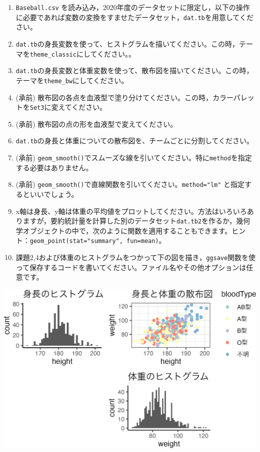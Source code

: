 \documentclass[
  a4paper,
]{ltjsbook}
\providecommand{\tightlist}{%
  \setlength{\itemsep}{0pt}\setlength{\parskip}{0pt}}\usepackage{longtable,booktabs,array}
\begin{document}
\begin{enumerate}
\def\labelenumi{\arabic{enumi}.}
\tightlist
\item
  \texttt{Baseball.csv}
  を読み込み，2020年度のデータセットに限定し，以下の操作に必要であれば変数の変換をすませたデータセット，\texttt{dat.tb}を用意してください。
\item
  \texttt{dat.tb}の身長変数を使って、ヒストグラムを描いてください。この時，テーマを\texttt{theme\_classic}にしてください。。
\item
  \texttt{dat.tb}の身長変数と体重変数を使って、散布図を描いてください。この時，テーマを\texttt{theme\_bw}にしてください。
\item
  (承前)
  散布図の各点を血液型で塗り分けてください。この時，カラーパレットを\texttt{Set3}に変えてください。
\item
  (承前) 散布図の点の形を血液型で変えてください。
\item
  \texttt{dat.tb}の身長と体重についての散布図を、チームごとに分割してください。
\item
  (承前)
  \texttt{geom\_smooth()}でスムーズな線を引いてください。特に\texttt{method}を指定する必要はありません。
\item
  (承前)
  \texttt{geom\_smooth()}で直線関数を引いてください。\texttt{method="lm"}
  と指定するといいでしょう。
\item
  x軸は身長、y軸は体重の平均値をプロットしてください。方法はいろいろありますが，要約統計量を計算した別のデータセット\texttt{dat.tb2}を作るか，幾何学オブジェクトの中で，次のように関数を適用することもできます。ヒント：\texttt{geom\_point(stat="summary",\ fun=mean)}。
\item
  課題2,4および体重のヒストグラムをつかって下の図を描き，\texttt{ggsave}関数を使って保存するコードを書いてください。ファイル名やその他オプションは任意です。
\end{enumerate}

\includegraphics{chapter04_files/figure-pdf/unnamed-chunk-4-1.png}
\end{document}
